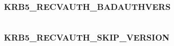 \documentclass[letterpaper,10pt,english]{sphinxmanual}
\begin{document}
\begin{fulllineitems}
\label{appdev/refs/macros/KRB5_REALM_BRANCH_CHAR:KRB5_REALM_BRANCH_CHAR}
\end{fulllineitems}


\begin{tabulary}{\linewidth}{|L|L|}
\hline

 & 
\\
\hline\end{tabulary}



\subsubsection{KRB5\_RECVAUTH\_BADAUTHVERS}
\label{appdev/refs/macros/KRB5_RECVAUTH_BADAUTHVERS:krb5-recvauth-badauthvers-data}\label{appdev/refs/macros/KRB5_RECVAUTH_BADAUTHVERS:krb5-recvauth-badauthvers}\label{appdev/refs/macros/KRB5_RECVAUTH_BADAUTHVERS::doc}

\begin{fulllineitems}
\label{appdev/refs/macros/KRB5_RECVAUTH_BADAUTHVERS:KRB5_RECVAUTH_BADAUTHVERS}
\end{fulllineitems}


\begin{tabulary}{\linewidth}{|L|L|}
\hline

 & 
\\
\hline\end{tabulary}



\subsubsection{KRB5\_RECVAUTH\_SKIP\_VERSION}
\label{appdev/refs/macros/KRB5_RECVAUTH_SKIP_VERSION:krb5-recvauth-skip-version}\label{appdev/refs/macros/KRB5_RECVAUTH_SKIP_VERSION:krb5-recvauth-skip-version-data}\label{appdev/refs/macros/KRB5_RECVAUTH_SKIP_VERSION::doc}

\begin{fulllineitems}
\label{appdev/refs/macros/KRB5_RECVAUTH_SKIP_VERSION:KRB5_RECVAUTH_SKIP_VERSION}
\end{fulllineitems}
\end{document}
